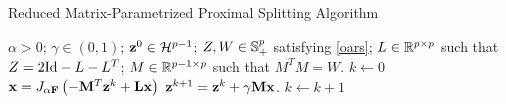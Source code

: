 \begin{algorithm} 
    \caption{Reduced Matrix-Parametrized Proximal Splitting Algorithm}\label{d_iteration} 
    \begin{algorithmic}[1] 
    \Require $\alpha > 0$; $\gamma \in (0,1)$; $\mathbf{z}^0 \in \mathcal{H}^{p-1}$; $Z, W \in \mathbb{S}_+^p$ satisfying \eqref{oars}; $L \in \mathbb R^{p \times p}$ such that $Z=2\mathrm{Id} - L - L^T$; $M \in \mathbb R^{p-1 \times p}$ such that $M^T M = W$.
    \State $k \gets 0$
    \Repeat
      \State $\mathbf{x} = J_{\alpha \mathbf{F}}\left(-\mathbf{M}^T\mathbf{z}^{k} + \mathbf{L} \mathbf{x}\right)$\label{d_itr1}
      \State $\mathbf{z}^{k+1} = \mathbf{z}^{k} + \gamma \mathbf{M} \mathbf{x}$.\label{d_itr2}
      \State $k \gets k+1$
\end{algorithmic}
\end{algorithm}